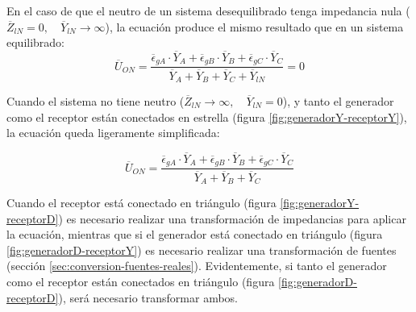 En el caso de que el neutro de un sistema desequilibrado tenga impedancia nula ($\overline{Z}_{lN} = 0,  \quad \overline{Y}_{lN} \to \infty$), la ecuación produce el mismo resultado que en un sistema equilibrado:
\[
  \overline{U}_{ON} = \frac{\overline{\epsilon}_{gA} \cdot \overline{Y}_A + \overline{\epsilon}_{gB} \cdot \overline{Y}_B + \overline{\epsilon}_{gC} \cdot \overline{Y}_C}{\overline{Y}_A + \overline{Y}_B + \overline{Y}_C + \overline{Y}_{lN}} = 0
\]


Cuando el sistema no tiene neutro ($\overline{Z}_{lN} \to \infty, \quad \overline{Y}_{lN} = 0$), y tanto el generador como el receptor están conectados en estrella (figura \ref{fig:generadorY-receptorY}), la ecuación queda ligeramente simplificada:

\[
  \overline{U}_{ON} = \frac{\overline{\epsilon}_{gA} \cdot \overline{Y}_A + \overline{\epsilon}_{gB} \cdot \overline{Y}_B + \overline{\epsilon}_{gC} \cdot \overline{Y}_C}{\overline{Y}_A + \overline{Y}_B + \overline{Y}_C}
\]

Cuando el receptor está conectado en triángulo (figura \ref{fig:generadorY-receptorD}) es necesario realizar una transformación de impedancias para aplicar la ecuación, mientras que si el generador está conectado en triángulo (figura \ref{fig:generadorD-receptorY}) es necesario realizar una transformación de fuentes (sección \ref{sec:conversion-fuentes-reales}). Evidentemente, si tanto el generador como el receptor están conectados en triángulo (figura \ref{fig:generadorD-receptorD}), será necesario transformar ambos.


